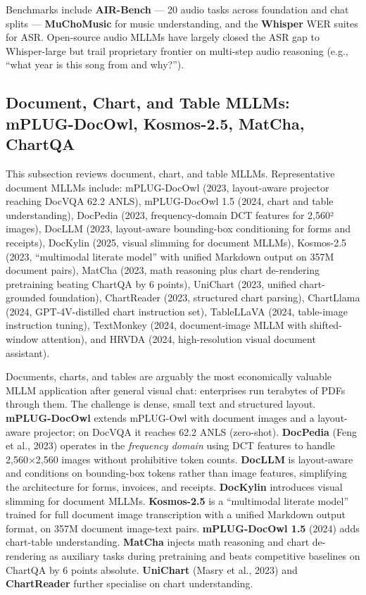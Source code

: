 \documentclass{article}
\begin{document}
Benchmarks include \textbf{AIR-Bench} \citep{yang20242024} --- 20 audio tasks across foundation and chat splits --- \textbf{MuChoMusic} for music understanding, and the \textbf{Whisper} WER suites for ASR. Open-source audio MLLMs have largely closed the ASR gap to Whisper-large but trail proprietary frontier on multi-step audio reasoning (e.g., ``what year is this song from and why?'').

\subsection{Document, Chart, and Table MLLMs: mPLUG-DocOwl, Kosmos-2.5, MatCha, ChartQA}\label{document-chart-and-table-mllms-mplug-docowl-kosmos-2.5-matcha-chartqa}

This subsection reviews document, chart, and table MLLMs. Representative document MLLMs include: mPLUG-DocOwl (2023, layout-aware projector reaching DocVQA 62.2 ANLS), mPLUG-DocOwl 1.5 (2024, chart and table understanding), DocPedia (2023, frequency-domain DCT features for 2,560² images), DocLLM (2023, layout-aware bounding-box conditioning for forms and receipts), DocKylin (2025, visual slimming for document MLLMs), Kosmos-2.5 (2023, ``multimodal literate model'' with unified Markdown output on 357M document pairs), MatCha (2023, math reasoning plus chart de-rendering pretraining beating ChartQA by 6 points), UniChart (2023, unified chart-grounded foundation), ChartReader (2023, structured chart parsing), ChartLlama (2024, GPT-4V-distilled chart instruction set), TableLLaVA (2024, table-image instruction tuning), TextMonkey (2024, document-image MLLM with shifted-window attention), and HRVDA (2024, high-resolution visual document assistant).

Documents, charts, and tables are arguably the most economically valuable MLLM application after general visual chat: enterprises run terabytes of PDFs through them. The challenge is dense, small text and structured layout. \textbf{mPLUG-DocOwl} \citep{ye20232023} extends mPLUG-Owl with document images and a layout-aware projector; on DocVQA it reaches 62.2 ANLS (zero-shot). \textbf{DocPedia} (Feng et al., 2023) operates in the \emph{frequency domain} using DCT features to handle 2,560×2,560 images without prohibitive token counts. \textbf{DocLLM} \citep{wang20232023} is layout-aware and conditions on bounding-box tokens rather than image features, simplifying the architecture for forms, invoices, and receipts. \textbf{DocKylin} \citep{zhang20242024} introduces visual slimming for document MLLMs. \textbf{Kosmos-2.5} \citep{lv20232023} is a ``multimodal literate model'' trained for full document image transcription with a unified Markdown output format, on 357M document image-text pairs. \textbf{mPLUG-DocOwl 1.5} (2024) adds chart-table understanding. \textbf{MatCha} \citep{liu2023visualinstructiont} injects math reasoning and chart de-rendering as auxiliary tasks during pretraining and beats competitive baselines on ChartQA by 6 points absolute. \textbf{UniChart} (Masry et al., 2023) and \textbf{ChartReader} \citep{cheng20242024} further specialise on chart understanding.
\end{document}
